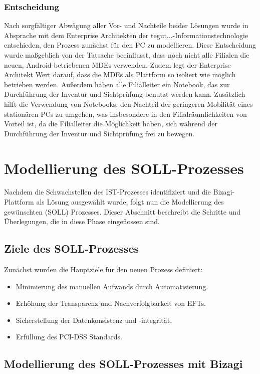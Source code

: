 \documentclass[12pt, a4paper]{article}
\begin{document}
\subsubsection{Entscheidung}
Nach sorgfältiger Abwägung aller Vor- und Nachteile beider Lösungen wurde in Absprache mit dem Enterprise Architekten der tegut...-Informationstechnologie entschieden, 
den Prozess zunächst für den PC zu modellieren. Diese Entscheidung wurde maßgeblich von der Tatsache beeinflusst, dass noch nicht alle Filialen die neuen, Android-betriebenen 
MDEs verwenden. Zudem legt der Enterprise Architekt Wert darauf, dass die MDEs als Plattform so isoliert wie möglich betrieben werden. \cite{Schlosser_Ehm_2023} Außerdem haben alle Filialleiter ein Notebook,
das zur Durchführung der Inventur und Sichtprüfung benutzt werden kann. Zusätzlich hilft die Verwendung von Notebooks, den Nachteil der geringeren Mobilität 
eines stationären PCs zu umgehen, was insbesondere in den Filialräumlichkeiten von Vorteil ist, da die Filialleiter die Möglichkeit haben, sich während der Durchführung 
der Inventur und Sichtprüfung frei zu bewegen.


\section{Modellierung des SOLL-Prozesses}

Nachdem die Schwachstellen des IST-Prozesses identifiziert und die Bizagi-Plattform als Lösung ausgewählt wurde, folgt nun die Modellierung des gewünschten (SOLL) Prozesses. 
Dieser Abschnitt beschreibt die Schritte und Überlegungen, die in diese Phase eingeflossen sind.

\subsection{Ziele des SOLL-Prozesses}

Zunächst wurden die Hauptziele für den neuen Prozess definiert:
\begin{itemize}
\item Minimierung des manuellen Aufwands durch Automatisierung.
\item Erhöhung der Transparenz und Nachverfolgbarkeit von EFTs.
\item Sicherstellung der Datenkonsistenz und -integrität.
\item Erfüllung des PCI-DSS Standards.
\end{itemize}


\subsection{Modellierung des SOLL-Prozesses mit Bizagi}
\end{document}
